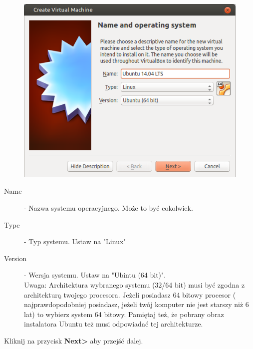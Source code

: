 \twocolumn
\begin{figure}
		\includegraphics[width=\linewidth]{images/virtualbox_wizard1.png}
\end{figure}
\begin{description}
\item[Name] - Nazwa systemu operacyjnego. Może to być cokolwiek.
\item[Type] - Typ systemu. Ustaw na "Linux"
\item[Version] - Wersja systemu. Ustaw na "Ubintu (64 bit)".\\
Uwaga: Architektura wybranego systemu (32/64 bit) musi być zgodna z architekturą twojego procesora. Jeżeli posiadasz 64 bitowy procesor ( najprawdopodobniej posiadasz, jeżeli twój komputer nie jest starszy niż 6 lat) to wybierz system 64 bitowy. Pamiętaj też, że pobrany obraz instalatora Ubuntu też musi odpowiadać tej architekturze.
\end{description}
\begin{flushright}
Kliknij na przycisk \textbf{Next\textgreater} aby przejść dalej.
\end{flushright}
\onecolumn
\clearpage

